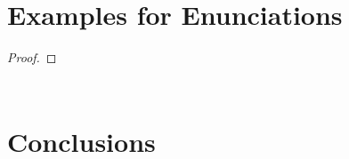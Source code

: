 \documentclass[HARVARD,LATO2COL]{WileyNJDv5}
\begin{document}

\section{Examples for Enunciations}\label{sec:theorems}

\begin{theorem}\label{thm:1}

\end{theorem}

\begin{proposition}

\end{proposition}

\begin{definition}

\end{definition}

\begin{proof}

\end{proof}



\begin{algorithm}
\caption{\enskip}\label{algo:1}
\begin{algorithmic}
\State
\end{algorithmic}
\end{algorithm}

\begin{align}\label{eq:1}
 &  \nonumber\\
 &
\end{align}

\section{Conclusions}\label{sec:conclusions}
\end{document}
